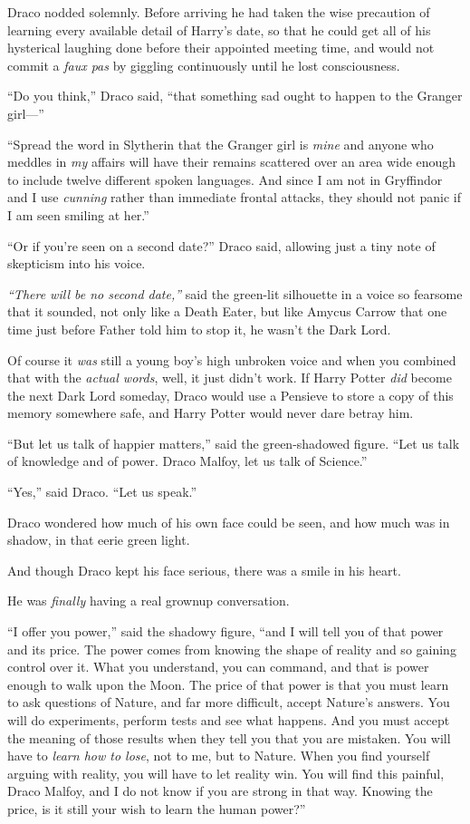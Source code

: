 Draco nodded solemnly. Before arriving he had taken the wise precaution
of learning every available detail of Harry's date, so that he could get
all of his hysterical laughing done before their appointed meeting time,
and would not commit a \emph{faux pas} by giggling continuously until he
lost consciousness.

``Do you think,'' Draco said, ``that something sad ought to happen to
the Granger girl---''

``Spread the word in Slytherin that the Granger girl is \emph{mine} and
anyone who meddles in \emph{my} affairs will have their remains
scattered over an area wide enough to include twelve different spoken
languages. And since I am not in Gryffindor and I use \emph{cunning}
rather than immediate frontal attacks, they should not panic if I am
seen smiling at her.''

``Or if you're seen on a second date?'' Draco said, allowing just a tiny
note of skepticism into his voice.

\emph{``There will be no second date,''} said the green-lit silhouette
in a voice so fearsome that it sounded, not only like a Death Eater, but
like Amycus Carrow that one time just before Father told him to stop it,
he wasn't the Dark Lord.

Of course it \emph{was} still a young boy's high unbroken voice and when
you combined that with the \emph{actual words}, well, it just didn't
work. If Harry Potter \emph{did} become the next Dark Lord someday,
Draco would use a Pensieve to store a copy of this memory somewhere
safe, and Harry Potter would never dare betray him.

``But let us talk of happier matters,'' said the green-shadowed figure.
``Let us talk of knowledge and of power. Draco Malfoy, let us talk of
Science.''

``Yes,'' said Draco. ``Let us speak.''

Draco wondered how much of his own face could be seen, and how much was
in shadow, in that eerie green light.

And though Draco kept his face serious, there was a smile in his heart.

He was \emph{finally} having a real grownup conversation.

``I offer you power,'' said the shadowy figure, ``and I will tell you of
that power and its price. The power comes from knowing the shape of
reality and so gaining control over it. What you understand, you can
command, and that is power enough to walk upon the Moon. The price of
that power is that you must learn to ask questions of Nature, and far
more difficult, accept Nature's answers. You will do experiments,
perform tests and see what happens. And you must accept the meaning of
those results when they tell you that you are mistaken. You will have to
\emph{learn how to lose}, not to me, but to Nature. When you find
yourself arguing with reality, you will have to let reality win. You
will find this painful, Draco Malfoy, and I do not know if you are
strong in that way. Knowing the price, is it still your wish to learn
the human power?''

